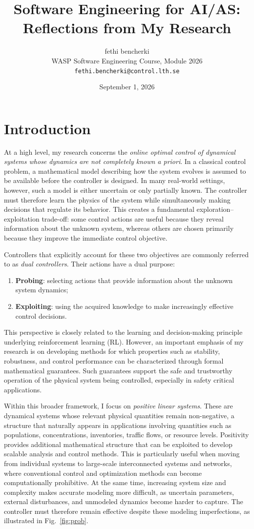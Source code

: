 \documentclass[11pt,a4paper]{article}
\title{Software Engineering for AI/AS: Reflections from My Research}
\author{fethi bencherki\\
WASP Software Engineering Course, Module 2026\\
\texttt{fethi.bencherki@control.lth.se}}
\date{September 1, 2026}
\begin{document}
\maketitle



\section{Introduction}

At a high level, my research concerns the \emph{online optimal control of dynamical systems whose dynamics are not completely known a priori}. In a classical control problem, a mathematical model describing how the system evolves is assumed to be available before the controller is designed. In many real-world settings, however, such a model is either uncertain or only partially known. The controller must therefore learn the physics of the system while simultaneously making decisions that regulate its behavior. This creates a fundamental exploration--exploitation trade-off: some control actions are useful because they reveal information about the unknown system, whereas others are chosen primarily because they improve the immediate control objective.

Controllers that explicitly account for these two objectives are commonly referred to as \emph{dual controllers}. Their actions have a dual purpose:
\begin{enumerate}
\item[\it{(1)}] \textbf{Probing}: selecting actions that provide information about the unknown system dynamics; 
\item[\it{(2)}] \textbf{Exploiting}: using the acquired knowledge to make increasingly effective control decisions.
\end{enumerate}
This perspective is closely related to the learning and decision-making principle underlying reinforcement learning (RL). However, an important emphasis of my research is on developing methods for which properties such as stability, robustness, and control performance can be characterized through formal mathematical guarantees. Such guarantees support the safe and trustworthy operation of the physical system being controlled, especially in safety critical applications.

Within this broader framework, I focus on \emph{positive linear systems}. These are dynamical systems whose relevant physical quantities remain non-negative, a structure that naturally appears in applications involving quantities such as populations, concentrations, inventories, traffic flows, or resource levels. Positivity provides additional mathematical structure that can be exploited to develop scalable analysis and control methods. This is particularly useful when moving from individual systems to large-scale interconnected systems and networks, where conventional control and optimization methods can become computationally prohibitive. At the same time, increasing system size and complexity makes accurate modeling more difficult, as uncertain parameters, external disturbances, and unmodeled dynamics become harder to capture. The controller must therefore remain effective despite these modeling imperfections, as illustrated in Fig.~\ref{fig:prob}.
\end{document}
